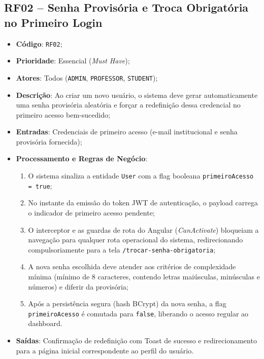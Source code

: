 \subsection{RF02 -- Senha Provisória e Troca Obrigatória no Primeiro Login}
\begin{itemize}
    \item \textbf{Código}: \texttt{RF02};
    \item \textbf{Prioridade}: Essencial (\textit{Must Have});
    \item \textbf{Atores}: Todos (\texttt{ADMIN}, \texttt{PROFESSOR}, \texttt{STUDENT});
    \item \textbf{Descrição}: Ao criar um novo usuário, o sistema deve gerar automaticamente uma senha provisória aleatória e forçar a redefinição dessa credencial no primeiro acesso bem-sucedido;
    \item \textbf{Entradas}: Credenciais de primeiro acesso (e-mail institucional e senha provisória fornecida);
    \item \textbf{Processamento e Regras de Negócio}:
    \begin{enumerate}
        \item O sistema sinaliza a entidade \texttt{User} com a flag booleana \texttt{primeiroAcesso = true};
        \item No instante da emissão do token JWT de autenticação, o payload carrega o indicador de primeiro acesso pendente;
        \item O interceptor e as guardas de rota do Angular (\textit{CanActivate}) bloqueiam a navegação para qualquer rota operacional do sistema, redirecionando compulsoriamente para a tela \texttt{/trocar-senha-obrigatoria};
        \item A nova senha escolhida deve atender aos critérios de complexidade mínima (mínimo de 8 caracteres, contendo letras maiúsculas, minúsculas e números) e diferir da provisória;
        \item Após a persistência segura (hash BCrypt) da nova senha, a flag \texttt{primeiroAcesso} é comutada para \texttt{false}, liberando o acesso regular ao dashboard.
    \end{enumerate}
    \item \textbf{Saídas}: Confirmação de redefinição com Toast de sucesso e redirecionamento para a página inicial correspondente ao perfil do usuário.
\end{itemize}

